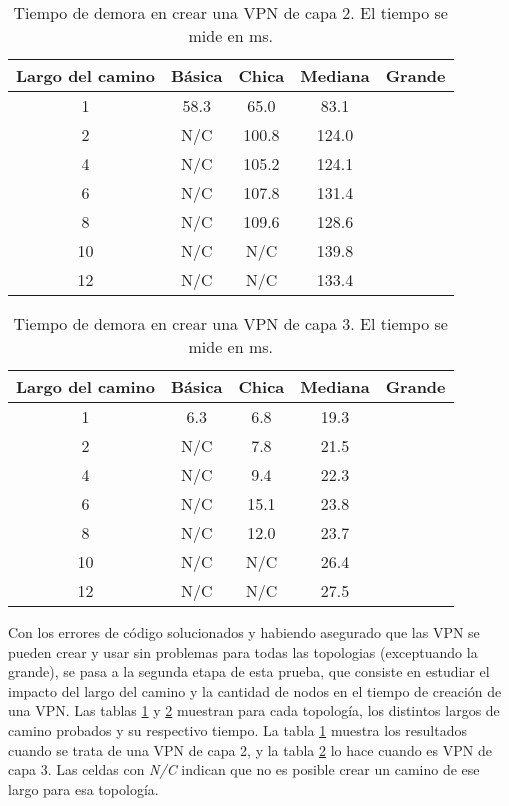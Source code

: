 \begin{table}[ht]
	\caption{Tiempo de demora en crear una VPN de capa 2. El tiempo se mide en ms.}
	\centering 
	\begin{tabular}{c c c c c}
		\hline\hline
		Largo del camino & Básica & Chica & Mediana  & Grande \\ [0.5ex]
		\hline
		1 & 58.3 & 65.0 & 83.1 &  \\
		2 & N/C & 100.8 & 124.0 &  \\
		4 & N/C & 105.2 & 124.1 &  \\
		6 & N/C & 107.8 & 131.4 &  \\
		8 & N/C & 109.6 & 128.6 &  \\
		10 & N/C & N/C & 139.8 &  \\
		12 & N/C & N/C & 133.4 &  \\ [1ex]
		\hline
	\end{tabular}
	\label{table:tiempo_vpn_2}
\end{table}

\begin{table}[ht]
	\caption{Tiempo de demora en crear una VPN de capa 3. El tiempo se mide en ms.}
	\centering 
	\begin{tabular}{c c c c c}
		\hline\hline
		Largo del camino & Básica & Chica & Mediana  & Grande \\ [0.5ex]
		\hline
		1 & 6.3 & 6.8 & 19.3 &  \\
		2 & N/C & 7.8 & 21.5 &  \\
		4 & N/C & 9.4 & 22.3 &  \\
		6 & N/C & 15.1 & 23.8 &  \\
		8 & N/C & 12.0 & 23.7 &  \\
		10 & N/C & N/C & 26.4 &  \\
		12 & N/C & N/C & 27.5 &  \\ [1ex]
		\hline
	\end{tabular}
	\label{table:tiempo_vpn_3}
\end{table}

Con los errores de código solucionados y habiendo asegurado que las VPN se pueden crear y usar sin problemas para todas las topologias (exceptuando la grande), se pasa a la segunda etapa de esta prueba, que consiste en estudiar el impacto del largo del camino y la cantidad de nodos en el tiempo de creación de una VPN. Las tablas \ref{table:tiempo_vpn_2} y \ref{table:tiempo_vpn_3} muestran para cada topología, los distintos largos de camino probados y su respectivo tiempo. La tabla \ref{table:tiempo_vpn_2} muestra los resultados cuando se trata de una VPN de capa 2, y la tabla \ref{table:tiempo_vpn_3} lo hace cuando es VPN de capa 3. Las celdas con \textit{N/C} indican que no es posible crear un camino de ese largo para esa topología. \\


